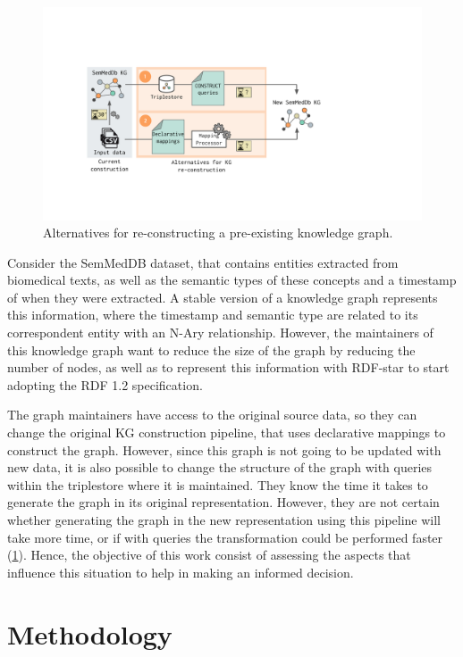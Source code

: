 \begin{figure}[t!]
    \centering
    \includegraphics[width=1\linewidth]{figures/chp6-1_motivating-example.pdf}
    \caption[KG re-construcion alternatives]{Alternatives for re-constructing a pre-existing knowledge graph.}
    \label{fig:chp6-1_mot-example}
\end{figure}

Consider the SemMedDB dataset, that contains entities extracted from biomedical texts, as well as the semantic types of these concepts and a timestamp of when they were extracted. A stable version of a knowledge graph represents this information, where the timestamp and semantic type are related to its correspondent entity with an N-Ary relationship. However, the maintainers of this knowledge graph want to reduce the size of the graph by reducing the number of nodes, as well as to represent this information with RDF-star to start adopting the RDF 1.2 specification.

The graph maintainers have access to the original source data, so they can change the original KG construction pipeline, that uses declarative mappings to construct the graph. However, since this graph is not going to be updated with new data, it is also possible to change the structure of the graph with queries within the triplestore where it is maintained. They know the time it takes to generate the graph in its original representation. However, they are not certain whether generating the graph in the new representation using this pipeline will take more time, or if with queries the transformation could be performed faster (\cref{fig:chp6-1_mot-example}). Hence, the objective of this work consist of assessing the aspects that influence this situation to help in making an informed decision.


\section{Methodology}
\label{sec:chp6-1_methodology}


